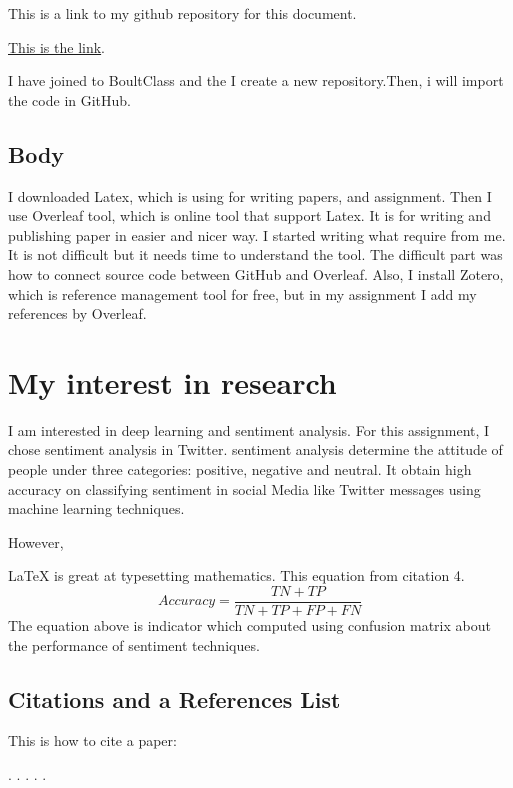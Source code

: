 \documentclass[a4paper]{article}
\begin{document}
This is a link to my github repository for this document.


\href{https://github.com/BoultClasses/CS-Research1.git}{This is the link}.

I have joined to BoultClass and the I create a new repository.Then, i will import the code in GitHub.

\subsection{Body}
I downloaded Latex, which is using for writing papers, and assignment. Then I use Overleaf tool, which is online tool that support Latex. It is for writing and publishing paper in easier and nicer way. I started writing what require from me. It is not difficult but it needs time to understand the tool. The difficult part was how to connect  source code between GitHub and Overleaf. Also, 
I install Zotero, which is reference management tool for free, but in my assignment I add my references by Overleaf.


\section{My interest in research }
  I am interested in deep learning and sentiment analysis. For this assignment, I chose sentiment analysis in Twitter.  sentiment analysis determine the attitude of people under three categories: positive, negative and neutral. It obtain high accuracy on classifying sentiment in social Media like Twitter messages using machine learning techniques.
  
  However, 

\LaTeX{} is great at typesetting mathematics. This equation from citation 4.  
\[Accuracy = \frac{TN + TP }{TN + TP + FP + FN }
      \]
      The equation above is indicator which computed using confusion matrix about the performance of sentiment techniques.
      
      
      
      
\subsection {Citations and a References List}



This is how to cite a paper:

\cite{patil2015sentiment}.
\cite{agarwal2011sentiment}.
\cite{go2009twitter}. 
\cite{desai2016techniques}.
\cite{rathan2017every}.







\end{document}
